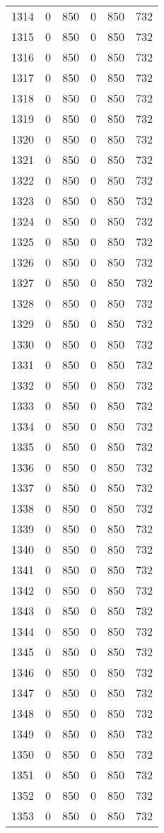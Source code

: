 \documentclass[a4paper]{ctexart}
\begin{document}
\begin{longtable}{p{1cm}|p{2cm}|p{2cm}|p{2cm}|P{2cm}|p{2cm}}
		1314&0&850&0&850&732\\
		1315&0&850&0&850&732\\
		1316&0&850&0&850&732\\
		1317&0&850&0&850&732\\
		1318&0&850&0&850&732\\
		1319&0&850&0&850&732\\
		1320&0&850&0&850&732\\
		1321&0&850&0&850&732\\
		1322&0&850&0&850&732\\
		1323&0&850&0&850&732\\
		1324&0&850&0&850&732\\
		1325&0&850&0&850&732\\
		1326&0&850&0&850&732\\
		1327&0&850&0&850&732\\
		1328&0&850&0&850&732\\
		1329&0&850&0&850&732\\
		1330&0&850&0&850&732\\
		1331&0&850&0&850&732\\
		1332&0&850&0&850&732\\
		1333&0&850&0&850&732\\
		1334&0&850&0&850&732\\
		1335&0&850&0&850&732\\
		1336&0&850&0&850&732\\
		1337&0&850&0&850&732\\
		1338&0&850&0&850&732\\
		1339&0&850&0&850&732\\
		1340&0&850&0&850&732\\
		1341&0&850&0&850&732\\
		1342&0&850&0&850&732\\
		1343&0&850&0&850&732\\
		1344&0&850&0&850&732\\
		1345&0&850&0&850&732\\
		1346&0&850&0&850&732\\
		1347&0&850&0&850&732\\
		1348&0&850&0&850&732\\
		1349&0&850&0&850&732\\
		1350&0&850&0&850&732\\
		1351&0&850&0&850&732\\
		1352&0&850&0&850&732\\
		1353&0&850&0&850&732\\

\end{longtable}
\end{document}
